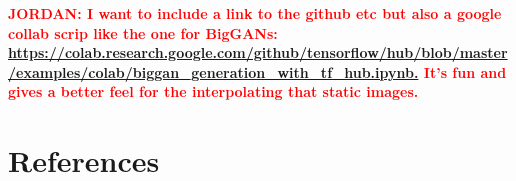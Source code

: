 \documentclass[12pt]{iopart}
\newcommand{\jordan}[1]{\textbf{\textcolor{red}{JORDAN: #1}}}
\begin{document}
\jordan{I want to include a link to the github etc but also a google collab
scrip like the one for BigGANs: \\
\url{https://colab.research.google.com/github/tensorflow/hub/blob/master/examples/colab/biggan_generation_with_tf_hub.ipynb.}
It's fun and gives a better feel for the interpolating that static images.}

\section*{References}


\clearpage

\appendix
\end{document}
